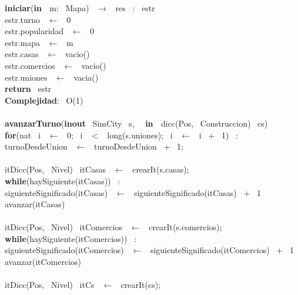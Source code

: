 \begin{Algoritmos}
    
\noindent \noindent\makebox[\linewidth]{\rule{\textwidth}{0.4pt}}
\textbf{iniciar}(\textbf{in \ }m: \ Mapa) \ $\longrightarrow$ \ res \ : \ estr\\
\indent estr.turno \ $\leftarrow$ \ 0\\
\indent estr.popularidad \ $\leftarrow$ \ 0\\
\indent estr.mapa \ $\leftarrow$ \ m\\
\indent estr.casas \ $\leftarrow$ \ vacio()\\
\indent estr.comercios \ $\leftarrow$ \ vacio()\\
\indent estr.uniones \ $\leftarrow$ \ vacia()\\
\indent \textbf{return} \ estr\\
\textbf{Complejidad}: \ O(1)\\
\noindent\makebox[\linewidth]{\rule{\textwidth}{0.4pt}}
\\
\noindent\makebox[\linewidth]{\rule{\textwidth}{0.4pt}}
\textbf{avanzarTurno}(\textbf{inout} \ SimCity \ s, \  \ \textbf{in \ }dicc(Pos, \ Construccion) \ cs)\\
\indent \textbf{for}(nat \ i \ $\leftarrow$ \ 0; \ i \ $<$ \ long(s.uniones); \ i \ $\leftarrow$ \ i \ + \ 1) \ : \ \\
\indent \indent turnoDesdeUnion \ $\leftarrow$ \ turnoDesdeUnion \ + \ 1;\\
\\
\indent itDicc(Pos, \ Nivel) \ itCasas \ $\leftarrow$ \ crearIt(s.casas);\\
\indent \textbf{while}(haySiguiente(itCasas)) \ :\\
\indent \indent siguienteSignificado(itCasas) \ $\leftarrow$ \ siguienteSignificado(itCasas) \ + \ 1\\
\indent \indent avanzar(itCasas)\\
\\
\indent itDicc(Pos, \ Nivel) \ itComercios \ $\leftarrow$ \ crearIt(s.comercios);\\
\indent \textbf{while}(haySiguiente(itComercios)) \ :\\
\indent \indent siguienteSignificado(itComercios) \ $\leftarrow$ \ siguienteSignificado(itComercios) \ + \ 1\\
\indent \indent avanzar(itComercios)\\
\\
\indent itDicc(Pos, \ Nivel) \ itCs \ $\leftarrow$ \ crearIt(cs);\\

\end{Algoritmos}
